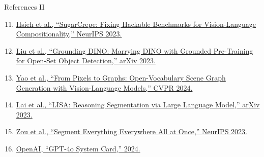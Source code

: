 \documentclass[aspectratio=1610]{beamer}
\begin{document}
\begin{frame}{References II}
\footnotesize
\begin{enumerate}
  \setcounter{enumi}{10}
  \item \href{https://arxiv.org/abs/2212.09645}{Hsieh et al., ``SugarCrepe: Fixing Hackable Benchmarks for Vision-Language Compositionality,'' NeurIPS 2023.}
  \item \href{https://arxiv.org/abs/2303.05499}{Liu et al., ``Grounding DINO: Marrying DINO with Grounded Pre-Training for Open-Set Object Detection,'' arXiv 2023.}
  \item \href{https://arxiv.org/abs/2404.00906}{Yao et al., ``From Pixels to Graphs: Open-Vocabulary Scene Graph Generation with Vision-Language Models,'' CVPR 2024.}
  \item \href{https://arxiv.org/abs/2306.05424}{Lai et al., ``LISA: Reasoning Segmentation via Large Language Model,'' arXiv 2023.}
  \item \href{https://arxiv.org/abs/2304.02643}{Zou et al., ``Segment Everything Everywhere All at Once,'' NeurIPS 2023.}
  \item \href{https://arxiv.org/abs/2405.14458}{OpenAI, ``GPT-4o System Card,'' 2024.}
\end{enumerate}
\end{frame}

\end{document}
